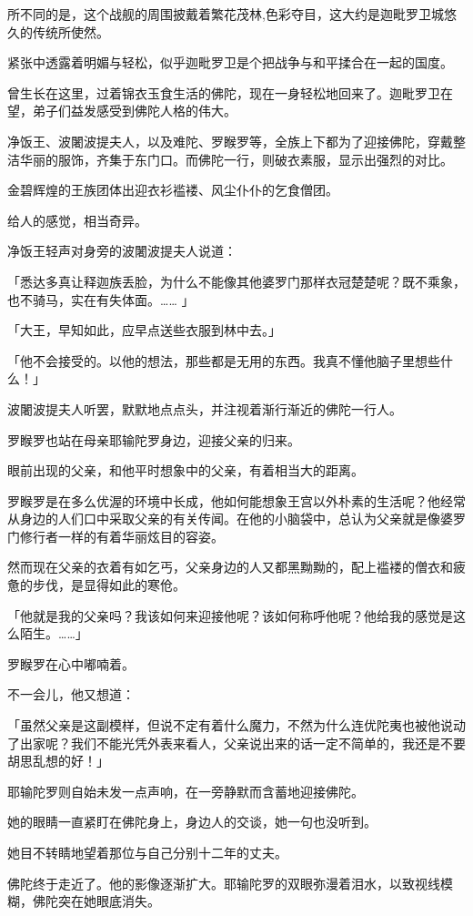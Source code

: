 \documentclass[twoside,openany]{book}
\begin{document}
所不同的是，这个战舰的周围披戴着繁花茂林,色彩夺目，这大约是迦毗罗卫城悠久的传统所使然。

紧张中透露着明媚与轻松，似乎迦毗罗卫是个把战争与和平揉合在一起的国度。

曾生长在这里，过着锦衣玉食生活的佛陀，现在一身轻松地回来了。迦毗罗卫在望，弟子们益发感受到佛陀人格的伟大。

净饭王、波闍波提夫人，以及难陀、罗睺罗等，全族上下都为了迎接佛陀，穿戴整洁华丽的服饰，齐集于东门口。而佛陀一行，则破衣素服，显示出强烈的对比。

金碧辉煌的王族团体出迎衣衫褴褛、风尘仆仆的乞食僧团。

给人的感觉，相当奇异。

净饭王轻声对身旁的波闍波提夫人说道：

「悉达多真让释迦族丢脸，为什么不能像其他婆罗门那样衣冠楚楚呢？既不乘象，也不骑马，实在有失体面。……	」

「大王，早知如此，应早点送些衣服到林中去。」

「他不会接受的。以他的想法，那些都是无用的东西。我真不懂他脑子里想些什么！」

波闍波提夫人听罢，默默地点点头，并注视着渐行渐近的佛陀一行人。

罗睺罗也站在母亲耶输陀罗身边，迎接父亲的归来。

眼前出现的父亲，和他平时想象中的父亲，有着相当大的距离。

罗睺罗是在多么优渥的环境中长成，他如何能想象王宫以外朴素的生活呢？他经常从身边的人们口中采取父亲的有关传闻。在他的小脑袋中，总认为父亲就是像婆罗门修行者一样的有着华丽炫目的容姿。

然而现在父亲的衣着有如乞丐，父亲身边的人又都黑黝黝的，配上褴褛的僧衣和疲惫的步伐，是显得如此的寒伧。

「他就是我的父亲吗？我该如何来迎接他呢？该如何称呼他呢？他给我的感觉是这么陌生。……」

罗睺罗在心中嘟喃着。

不一会儿，他又想道：

「虽然父亲是这副模样，但说不定有着什么魔力，不然为什么连优陀夷也被他说动了出家呢？我们不能光凭外表来看人，父亲说出来的话一定不简单的，我还是不要胡思乱想的好！」

耶输陀罗则自始未发一点声响，在一旁静默而含蓄地迎接佛陀。

她的眼睛一直紧盯在佛陀身上，身边人的交谈，她一句也没听到。

她目不转睛地望着那位与自己分别十二年的丈夫。

佛陀终于走近了。他的影像逐渐扩大。耶输陀罗的双眼弥漫着泪水，以致视线模糊，佛陀突在她眼底消失。
\end{document}
